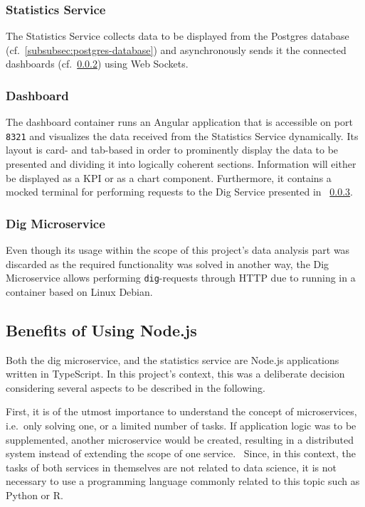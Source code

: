 \subsubsection{Statistics Service}\label{subsubsec:statistics-service}

The Statistics Service collects data to be displayed from the Postgres database (cf.~\ref{subsubsec:postgres-database}) and asynchronously sends it the connected dashboards (cf.~\ref{subsubsec:dashboard}) using Web Sockets.~\autocite[cf.][]{MDNWebDocs.2021}

\subsubsection{Dashboard}\label{subsubsec:dashboard}

The dashboard container runs an Angular application that is accessible on port \texttt{8321} and visualizes the data received from the Statistics Service dynamically.
Its layout is card- and tab-based in order to prominently display the data to be presented and dividing it into logically coherent sections.
Information will either be displayed as a KPI or as a chart component.
Furthermore, it contains a mocked terminal for performing requests to the Dig Service presented in ~\ref{subsubsec:dig-microservice}.

\subsubsection{Dig Microservice}\label{subsubsec:dig-microservice}

Even though its usage within the scope of this project's data analysis part was discarded as the required functionality was solved in another way, the Dig Microservice allows performing \texttt{dig}-requests through HTTP due to running in a container based on Linux Debian.

\subsection{Benefits of Using Node.js}\label{subsec:choosing-a-node-based-environment}

Both the dig microservice, and the statistics service are Node.js applications written in TypeScript.
In this project's context, this was a deliberate decision considering several aspects to be described in the following.

First, it is of the utmost importance to understand the concept of microservices, i.e.\ only solving one, or a limited number of tasks.
If application logic was to be supplemented, another microservice would be created, resulting in a distributed system instead of extending the scope of one service.~\autocite[cf.][p. 23]{Farcic.2016}
Since, in this context, the tasks of both services in themselves are not related to data science, it is not necessary to use a programming language commonly related to this topic such as Python or R.~\autocite[cf.][]{Gossett.2021}

